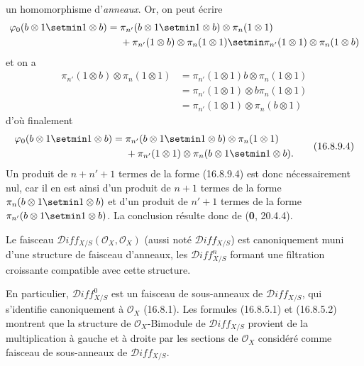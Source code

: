 un homomorphisme d'\emph{anneaux}. Or, on peut écrire
\[
  \begin{aligned}
  \varphi_0(b\otimes1\setmin 1\otimes b)
  ={}&\pi_{n'}(b\otimes1\setmin 1\otimes b)\otimes\pi_n(1\otimes1)\\
  &+\pi_{n'}(1\otimes b)\otimes\pi_n(1\otimes1)
  \setmin\pi_{n'}(1\otimes1)\otimes\pi_n(1\otimes b)
  \end{aligned}
\]
et on a
\[
  \begin{aligned}
  \pi_{n'}(1\otimes b)\otimes\pi_n(1\otimes1)
  &=\pi_{n'}(1\otimes1)b\otimes\pi_n(1\otimes1)\\
  &=\pi_{n'}(1\otimes1)\otimes b\pi_n(1\otimes1)\\
  &=\pi_{n'}(1\otimes1)\otimes\pi_n(b\otimes1)
  \end{aligned}
\]
d'où finalement
\[
  \begin{aligned}
  \varphi_0(b\otimes1\setmin 1\otimes b)
  ={}&\pi_{n'}(b\otimes1\setmin 1\otimes b)\otimes\pi_n(1\otimes1)\\
  &+\pi_{n'}(1\otimes1)\otimes\pi_n(b\otimes1\setmin 1\otimes b).
  \end{aligned}
  \tag{16.8.9.4}
  \label{IV.16.8.9.4}
\]
Un produit de $n+n'+1$ termes de la forme (16.8.9.4) est donc
nécessairement nul, car il en est ainsi d'un produit de $n+1$ termes de la
forme $\pi_n(b\otimes1\setmin 1\otimes b)$ et d'un produit de $n'+1$ termes de la
forme $\pi_{n'}(b\otimes1\setmin 1\otimes b)$. La conclusion résulte donc de
(\textbf{0}, 20.4.4).

\begin{corollary}[16.8.10]
\label{IV.16.8.10}
Le faisceau $\mathscr{D}\!iff_{X/S}(\mathcal{O}_X,\mathcal{O}_X)$ (aussi noté
$\mathscr{D}\!iff_{X/S}$) est canoniquement muni d'une structure de faisceau
d'anneaux, les $\mathscr{D}\!iff_{X/S}^n$ formant une filtration croissante
compatible avec cette structure.
\end{corollary}

En particulier, $\mathscr{D}\!iff_{X/S}^0$ est un faisceau de sous-anneaux de
$\mathscr{D}\!iff_{X/S}$, qui s'identifie canoniquement à $\mathcal{O}_X$
(16.8.1). Les formules (16.8.5.1) et (16.8.5.2) montrent que la structure de
$\mathcal{O}_X$-Bimodule de $\mathscr{D}\!iff_{X/S}$ provient de la
multiplication à gauche et à droite par les sections de $\mathcal{O}_X$
considéré comme faisceau de sous-anneaux de $\mathscr{D}\!iff_{X/S}$.

